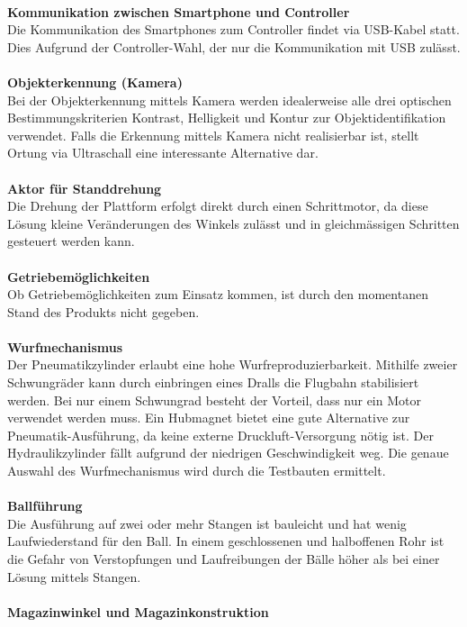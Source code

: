 	\\
	\textbf{Kommunikation zwischen Smartphone und Controller}\\
	Die Kommunikation des Smartphones zum Controller findet via USB-Kabel statt. Dies Aufgrund der Controller-Wahl, der nur die Kommunikation mit USB zulässt.\\
	\\
	\textbf{Objekterkennung (Kamera)}\\
	Bei der Objekterkennung mittels Kamera werden idealerweise alle drei optischen Bestimmungskriterien Kontrast, Helligkeit und Kontur zur Objektidentifikation verwendet. Falls die Erkennung mittels Kamera nicht realisierbar ist, stellt Ortung via Ultraschall eine interessante Alternative dar.\\
	\\
	\textbf{Aktor für Standdrehung}\\
	Die Drehung der Plattform erfolgt direkt durch einen Schrittmotor, da diese Lösung kleine Veränderungen des Winkels zulässt und in gleichmässigen Schritten gesteuert werden kann.\\
	\\
	\textbf{Getriebemöglichkeiten}\\
	Ob Getriebemöglichkeiten zum Einsatz kommen, ist durch den momentanen Stand des Produkts nicht gegeben.\\
	\\
	\textbf{Wurfmechanismus}\\
	Der Pneumatikzylinder erlaubt eine hohe Wurfreproduzierbarkeit. Mithilfe zweier Schwungräder kann durch einbringen eines Dralls die Flugbahn stabilisiert werden. Bei nur einem Schwungrad besteht der Vorteil, dass nur ein Motor verwendet werden muss. Ein Hubmagnet bietet eine gute Alternative zur Pneumatik-Ausführung, da keine externe Druckluft-Versorgung nötig ist. Der Hydraulikzylinder fällt aufgrund der niedrigen Geschwindigkeit weg. Die genaue Auswahl des Wurfmechanismus wird durch die Testbauten ermittelt.\\
	\\
	\textbf{Ballführung}\\
	Die Ausführung auf zwei oder mehr Stangen ist bauleicht und hat wenig Laufwiederstand für den Ball. In einem geschlossenen und halboffenen Rohr ist die Gefahr von Verstopfungen und Laufreibungen der Bälle höher als bei einer Lösung mittels Stangen.\\
	\\
	\textbf{Magazinwinkel und Magazinkonstruktion}\\
